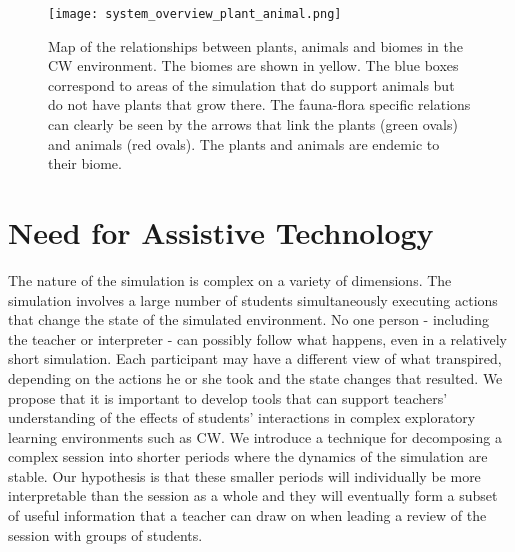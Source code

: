 \begin{figure}
\centering
\texttt{[image: system\_overview\_plant\_animal.png]}
\caption{Map of the relationships between plants, animals and biomes in the CW environment. The biomes are shown in yellow. The blue boxes correspond to areas of the simulation that do support animals but do not have plants that grow there. The fauna-flora specific relations can clearly be seen by the arrows that link the plants (green ovals) and animals (red ovals). The plants and animals are endemic to their biome.}
\label{fig:system_overview_plant_animal}
\end{figure}

\section{Need for Assistive Technology}\label{sec:need_for_assistive_tech}
The nature of the simulation is complex on a variety of dimensions. The simulation involves a large number of students simultaneously executing actions that change the state of the simulated environment.  No one person - including the teacher or interpreter - can possibly follow what happens, even in a relatively short simulation. Each participant may have a different view of what transpired, depending on the actions he or she took and the state changes that resulted. We propose that it is important to develop tools that can support teachers' understanding of the effects of students' interactions in complex exploratory learning environments such as CW. We introduce a technique for decomposing a complex session into shorter periods where the dynamics of the simulation are stable. Our hypothesis is that these smaller periods will individually be more interpretable than the session as a whole and they will eventually form a subset of useful information that a teacher can draw on when leading a review of the session with groups of students.
